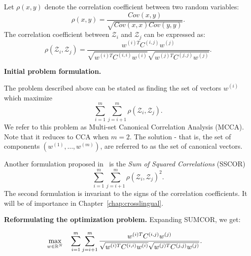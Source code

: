 Let $\rho\left(x,y\right)$ denote the correlation
 coefficient between two random variables:
\begin{equation*}
\rho\left(x,y\right) =
 \frac{Cov\left(x,y\right)}{\sqrt{Cov\left(x,x\right) Cov\left(y,y\right)}}.
\end{equation*}
 The correlation coefficient between $\mathcal{Z}_i$ and
 $\mathcal{Z}_j$ can be expressed as:
\begin{equation*}
\rho\left(\mathcal{Z}_i, \mathcal{Z}_j\right) = \frac{w^{(i)T} C^{(i,j)}
   w^{(j)}}{\sqrt{w^{(i)T} C^{(i,i)} w^{(i)}}\sqrt{w^{(j)T}
     C^{(j,j)} w^{(j)}} }.
\end{equation*}

\noindent\textbf{Initial problem formulation.} 

The problem described above can be stated as
finding the set of vectors $w^{(i)}$
which maximize
\begin{equation}\label{eq:SUMCOR}
\tag{SUMCOR}
\sum_{i = 1}^m \sum_{j = i+1}^m
\rho\left(\mathcal{Z}_i, \mathcal{Z}_j\right).
\end{equation}
We refer to this problem as Multi-set Canonical
Correlation Analysis (MCCA). Note that it reduces to CCA when
$m=2$. The solution - that is, the set of components $\left(w^{(1)}, \ldots, w^{(m)}\right)$, 
are referred to as the set of canonical vectors.

Another formulation proposed in~\cite{Kettenring} is the \emph{Sum of Squared Correlations} (SSCOR)
\begin{equation}\label{eq:SSCOR}
\tag{SSCOR}
\sum_{i = 1}^m \sum_{j = i+1}^m
\rho\left(\mathcal{Z}_i, \mathcal{Z}_j\right)^2.
\end{equation}
The second formulation is invariant to the signs of the correlation coefficients. It will
be of importance in Chapter~\ref{chap:crosslingual}.

\noindent\textbf{Reformulating the optimization problem.} 
Expanding SUMCOR, we get:

\begin{equation*}
\begin{aligned}
& \underset{w \in \mathbb{R}^N}{\text{max}} & & \sum_{i = 1}^m
  \sum_{j = i+1}^m \frac{w^{(i)T} C^{(i,j)}
    w^{(j)}}{\sqrt{w^{(i)T} C^{(i,i)} w^{(i)}} \sqrt{w^{(j)T}
      C^{(j,j)} w^{(j)}}}.
\end{aligned}
\end{equation*}

